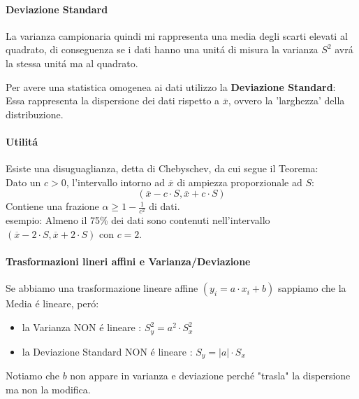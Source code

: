 \paragraph{Deviazione Standard} La varianza campionaria quindi mi rappresenta una media degli scarti elevati al quadrato, di conseguenza se i dati hanno una unitá di misura
la varianza $S^2$ avrá la stessa unitá ma al quadrato.

Per avere una statistica omogenea ai dati utilizzo la \textbf{Deviazione Standard}:
Essa rappresenta la dispersione dei dati rispetto a $\overline{x}$, ovvero la 'larghezza' della distribuzione.


\paragraph{Utilitá} Esiste una disuguaglianza, detta di Chebyschev, da cui segue il Teorema:
\\ Dato un $c>0$, l'intervallo intorno ad $\overline{x}$ di ampiezza proporzionale ad $S$:
$$ (\overline{x} - c\cdot S, \overline{x} + c\cdot S)$$
Contiene una frazione $\alpha \geq 1 - \frac{1}{c^2}$ di dati.
\\esempio: Almeno il 75\% dei dati sono contenuti nell'intervallo $(\overline{x} - 2\cdot S, \overline{x} +2\cdot S)$ con $c=2$.

\paragraph{Trasformazioni lineri affini e Varianza/Deviazione}
Se abbiamo una trasformazione lineare affine $(y_i = a \cdot x_i + b)$ sappiamo che la Media é lineare, peró:
\begin{itemize}
    \item la Varianza NON é lineare : $S_y^2 = a^2 \cdot S_x^2$
    \item la Deviazione Standard NON é lineare : $S_y = |a|\cdot S_x$
\end{itemize}
Notiamo che $b$ non appare in varianza e deviazione perché "trasla" la dispersione ma non la modifica.

